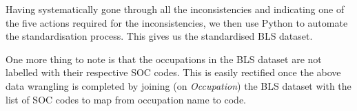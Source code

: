 \documentclass[11pt]{article}
\begin{document}
Having systematically gone through all the inconsistencies and indicating one of the five actions required for the inconsistencies, we then use Python to automate the standardisation process. This gives us the standardised BLS dataset.

One more thing to note is that the occupations in the BLS dataset are not labelled with their respective SOC codes. This is easily rectified once the above data wrangling is completed by joining (on \emph{Occupation}) the BLS dataset with the list of SOC codes to map from occupation name to code.
\end{document}
